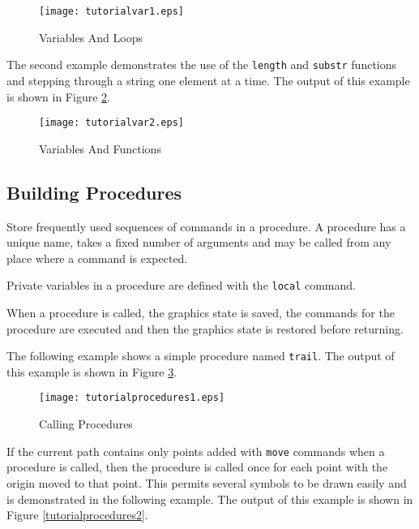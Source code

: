 

\begin{figure}[htb]
\texttt{[image: tutorialvar1.eps]}
\caption{Variables And Loops}
\label{tutorialvar1}
\end{figure}

The second example demonstrates the use of the
\texttt{length} and \texttt{substr}
functions
and stepping through a string one element at a time.
The output of this example is shown in Figure \ref{tutorialvar2}.



\begin{figure}[htb]
\texttt{[image: tutorialvar2.eps]}
\caption{Variables And Functions}
\label{tutorialvar2}
\end{figure}


\subsection{Building Procedures}

Store frequently used sequences of commands in a procedure.
A procedure has a unique name, takes a fixed number of arguments and
may be called from any place where a command is expected.

Private variables in a procedure are defined with the 
\texttt{local} command.

When a procedure is called, the graphics state
is saved, the commands for the procedure are executed and then the
graphics state is restored before returning.

The following example shows a simple procedure named \texttt{trail}.
The output of this example is shown in Figure \ref{tutorialprocedures1}.



\begin{figure}[htb]
\texttt{[image: tutorialprocedures1.eps]}
\caption{Calling Procedures}
\label{tutorialprocedures1}
\end{figure}

If the current path contains only points added with \texttt{move}
commands when a procedure is called, then the
procedure is called once for each point with the origin
moved to that point.  This permits several symbols to be drawn
easily and is demonstrated in the following example.  The 
output of this example is shown in Figure \ref{tutorialprocedures2}.



